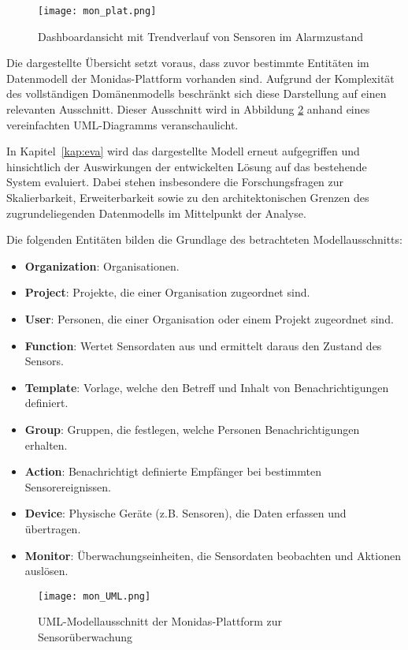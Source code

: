 \begin{figure}[H]
  \centering
  \texttt{[image: mon\_plat.png]}
 \caption{Dashboardansicht mit Trendverlauf von Sensoren im Alarmzustand}
  \label{fig:mon_plat}
\end{figure}

Die dargestellte Übersicht setzt voraus, dass zuvor bestimmte Entitäten im Datenmodell der Monidas-Plattform vorhanden sind. Aufgrund der Komplexität des vollständigen Domänenmodells beschränkt sich diese Darstellung auf einen relevanten Ausschnitt. Dieser Ausschnitt wird in Abbildung \ref{fig:mon_UML} anhand eines vereinfachten UML-Diagramms veranschaulicht.

In Kapitel~\ref{kap:eva} wird das dargestellte Modell erneut aufgegriffen und hinsichtlich der Auswirkungen der entwickelten Lösung auf das bestehende System evaluiert. Dabei stehen insbesondere die Forschungsfragen zur Skalierbarkeit, Erweiterbarkeit sowie zu den architektonischen Grenzen des zugrundeliegenden Datenmodells im Mittelpunkt der Analyse.

Die folgenden Entitäten bilden die Grundlage des betrachteten Modellausschnitts:
\begin{itemize}
  \item \textbf{Organization}: Organisationen.
  \item \textbf{Project}: Projekte, die einer Organisation zugeordnet sind.
  \item \textbf{User}: Personen, die einer Organisation oder einem Projekt zugeordnet sind.
  \item \textbf{Function}: Wertet Sensordaten aus und ermittelt daraus den Zustand des Sensors.
  \item \textbf{Template}: Vorlage, welche den Betreff und Inhalt von Benachrichtigungen definiert.
  \item \textbf{Group}: Gruppen, die festlegen, welche Personen Benachrichtigungen erhalten.
  \item \textbf{Action}: Benachrichtigt definierte Empfänger bei bestimmten Sensorereignissen.
  \item \textbf{Device}: Physische Geräte (z.B. Sensoren), die Daten erfassen und übertragen.
  \item \textbf{Monitor}: Überwachungseinheiten, die Sensordaten beobachten und Aktionen auslösen.
\end{itemize}

\begin{figure}[H]
  \centering
  \texttt{[image: mon\_UML.png]}
  \caption{UML-Modellausschnitt der Monidas-Plattform zur Sensorüberwachung}
  \label{fig:mon_UML}
\end{figure}

